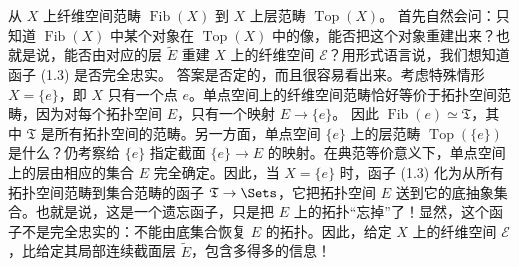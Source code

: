 从 $X$ 上纤维空间范畴 $\operatorname{Fib}(X)$ 到 $X$ 上层范畴 $\operatorname{Top}(X)$。
首先自然会问：只知道 $\operatorname{Fib}(X)$ 中某个对象在 $\operatorname{Top}(X)$ 中的像，能否把这个对象重建出来？也就是说，能否由对应的层 $\widetilde E$ 重建 $X$ 上的纤维空间 $\mathcal E$？用形式语言说，我们想知道函子 (1.3) 是否完全忠实。
答案是否定的，而且很容易看出来。考虑特殊情形 $X=\{e\}$，即 $X$ 只有一个点 $e$。单点空间上的纤维空间范畴恰好等价于拓扑空间范畴，因为对每个拓扑空间 $E$，只有一个映射 $E\to\{e\}$。
因此 $\operatorname{Fib}(e)\simeq\mathfrak T$，其中 $\mathfrak T$ 是所有拓扑空间的范畴。另一方面，单点空间 $\{e\}$ 上的层范畴 $\operatorname{Top}(\{e\})$ 是什么？仍考察给 $\{e\}$ 指定截面 $\{e\}\to E$ 的映射。在典范等价意义下，单点空间上的层由相应的集合 $E$ 完全确定。因此，当 $X=\{e\}$ 时，函子 (1.3) 化为从所有拓扑空间范畴到集合范畴的函子 $\mathfrak T\to\Sets$，它把拓扑空间 $E$ 送到它的底抽象集合。也就是说，这是一个遗忘函子，只是把 $E$ 上的拓扑“忘掉”了！显然，这个函子不是完全忠实的：不能由底集合恢复 $E$ 的拓扑。因此，给定 $X$ 上的纤维空间 $\mathcal E$，比给定其局部连续截面层 $\widetilde E$，包含多得多的信息！
